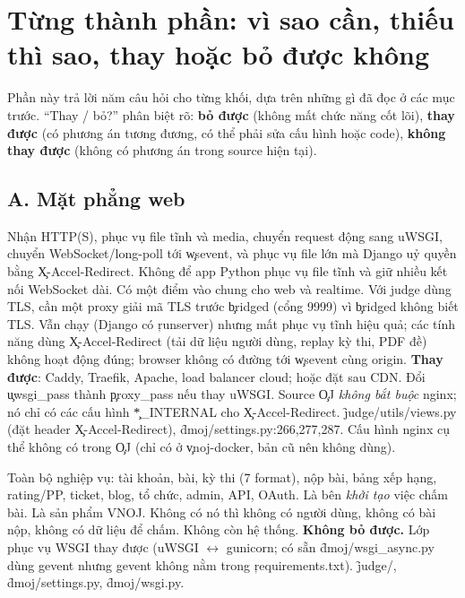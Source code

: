 \section{Từng thành phần: vì sao cần, thiếu thì sao, thay hoặc bỏ được không}\label{sec:components}
Phần này trả lời năm câu hỏi cho từng khối, dựa trên những gì đã đọc ở các mục trước. ``Thay / bỏ?'' phân biệt rõ: \textbf{bỏ được} (không mất chức năng cốt lõi), \textbf{thay được} (có phương án tương đương, có thể phải sửa cấu hình hoặc code), \textbf{không thay được} (không có phương án trong source hiện tại).

\subsection*{A. Mặt phẳng web}
{Nhận HTTP(S), phục vụ file tĩnh và media, chuyển request động sang uWSGI, chuyển WebSocket/long-poll tới \c{wsevent}, và phục vụ file lớn mà Django uỷ quyền bằng \c{X-Accel-Redirect}.}
{Không để app Python phục vụ file tĩnh và giữ nhiều kết nối WebSocket dài. Có một điểm vào chung cho web và realtime. Với judge dùng TLS, cần một proxy giải mã TLS trước \c{bridged} (cổng 9999) vì \c{bridged} không biết TLS.}
{Vẫn chạy (Django có \c{runserver}) nhưng mất phục vụ tĩnh hiệu quả; các tính năng dùng \c{X-Accel-Redirect} (tải dữ liệu người dùng, replay kỳ thi, PDF đề) không hoạt động đúng; browser không có đường tới \c{wsevent} cùng origin.}
{\textbf{Thay được}: Caddy, Traefik, Apache, load balancer cloud; hoặc đặt sau CDN. Đổi \c{uwsgi_pass} thành \c{proxy_pass} nếu thay uWSGI. Source \c{OJ} \emph{không bắt buộc} nginx; nó chỉ có các cấu hình \c{*_INTERNAL} cho \c{X-Accel-Redirect}.}
{\f{judge/utils/views.py} (đặt header \c{X-Accel-Redirect}), \f{dmoj/settings.py:266,277,287}. Cấu hình nginx cụ thể không có trong \c{OJ} (chỉ có ở \c{vnoj-docker}, bản cũ nên không dùng).}

{Toàn bộ nghiệp vụ: tài khoản, bài, kỳ thi (7 format), nộp bài, bảng xếp hạng, rating/PP, ticket, blog, tổ chức, admin, API, OAuth. Là bên \emph{khởi tạo} việc chấm bài.}
{Là sản phẩm VNOJ. Không có nó thì không có người dùng, không có bài nộp, không có dữ liệu để chấm.}
{Không còn hệ thống.}
{\textbf{Không bỏ được.} Lớp phục vụ WSGI thay được (uWSGI $\leftrightarrow$ gunicorn; có sẵn \f{dmoj/wsgi_async.py} dùng gevent nhưng gevent không nằm trong \c{requirements.txt}).}
{\f{judge/}, \f{dmoj/settings.py}, \f{dmoj/wsgi.py}.}

